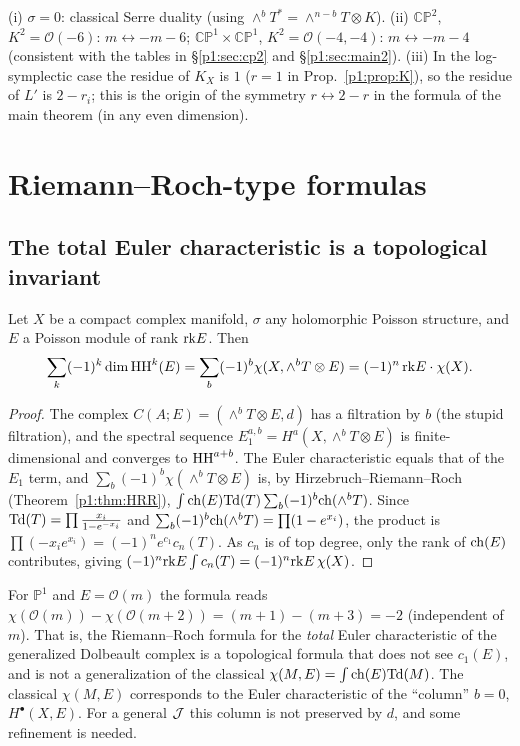 \begin{rem}
(i) $\sigma=0$: classical Serre duality (using $\wedge^bT^*=\wedge^{n-b}T\otimes K$). (ii) $\mathbb{CP}^2$, $K^2=\mathcal O(-6)$: $m\leftrightarrow-m-6$; $\mathbb{CP}^1\times\mathbb{CP}^1$, $K^2=\mathcal O(-4,-4)$: $m\leftrightarrow-m-4$ (consistent with the tables in \S\ref{p1:sec:cp2} and \S\ref{p1:sec:main2}). (iii) In the log-symplectic case the residue of $K_X$ is $1$ ($r=1$ in Prop.~\ref{p1:prop:K}), so the residue of $L'$ is $2-r_i$; this is the origin of the symmetry $r\leftrightarrow2-r$ in the formula of the main theorem (in any even dimension).
\end{rem}

\section{Riemann--Roch-type formulas}\label{p1:sec:RR}
\subsection{The total Euler characteristic is a topological invariant}
\begin{prop}\tP\label{p1:prop:euler}
Let $X$ be a compact complex manifold, $\sigma$ any holomorphic Poisson structure, and $E$ a Poisson module of rank $\mathrm{rk} E$. Then
\[\sum_k(-1)^k\dim\mathrm{HH}^k(E)=\sum_b(-1)^b\chi(X,\wedge^bT\otimes E)=(-1)^n\,\mathrm{rk} E\cdot\chi(X).\]
\end{prop}
\begin{proof}
The complex $C(A;E)=(\wedge^bT\otimes E,d)$ has a filtration by $b$ (the stupid filtration), and the spectral sequence $E_1^{a,b}=H^a(X,\wedge^bT\otimes E)$ is finite-dimensional and converges to $\mathrm{HH}^{a+b}$. The Euler characteristic equals that of the $E_1$ term, and $\sum_b(-1)^b\chi(\wedge^bT\otimes E)$ is, by Hirzebruch--Riemann--Roch (Theorem~\ref{p1:thm:HRR}),
$\int\mathrm{ch}(E)\mathrm{Td}(T)\sum_b(-1)^b\mathrm{ch}(\wedge^bT)$. Since $\mathrm{Td}(T)=\prod\frac{x_i}{1-e^{-x_i}}$ and $\sum_b(-1)^b\mathrm{ch}(\wedge^bT)=\prod(1-e^{x_i})$, the product is $\prod(-x_ie^{x_i})=(-1)^ne^{c_1}c_n(T)$. As $c_n$ is of top degree, only the rank of $\mathrm{ch}(E)$ contributes, giving $(-1)^n\mathrm{rk} E\int c_n(T)=(-1)^n\mathrm{rk} E\,\chi(X)$.\qedhere
\end{proof}
\begin{rem}[\tP\ Meaning]
For $\mathbb{P}^1$ and $E=\mathcal O(m)$ the formula reads $\chi(\mathcal O(m))-\chi(\mathcal O(m+2))=(m+1)-(m+3)=-2$ (independent of $m$). That is, the Riemann--Roch formula for the \emph{total} Euler characteristic of the generalized Dolbeault complex is a topological formula that does not see $c_1(E)$, and is not a generalization of the classical $\chi(M,E)=\int\mathrm{ch}(E)\mathrm{Td}(M)$. The classical $\chi(M,E)$ corresponds to the Euler characteristic of the ``column'' $b=0$, $H^\bullet(X,E)$. For a general $\mathcal J$ this column is not preserved by $d$, and some refinement is needed.
\end{rem}

